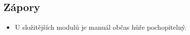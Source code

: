 \subsection*{Zápory}

\begin{itemize}
    \item U složitějších modulů je manuál občas hůře pochopitelný.
\end{itemize}
